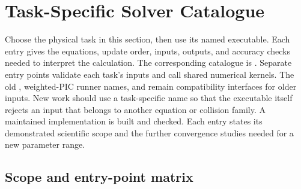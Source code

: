 \section{Task-Specific Solver Catalogue}
\label{sec:task-solver-catalogue}

Choose the physical task in this section, then use its named executable.
Each entry gives the equations, update order, inputs, outputs, and accuracy
checks needed to interpret the calculation. The corresponding catalogue is
. Separate entry points validate each task's
inputs and call shared numerical kernels.  The old
, weighted-PIC runner names, and
 remain compatibility interfaces for older
inputs.  New work should use a task-specific name so that the executable
itself rejects an input that belongs to another equation or collision family.
A maintained implementation is built and checked. Each entry states its
demonstrated scientific scope and the further convergence studies needed for
a new parameter range.

\subsection{Scope and entry-point matrix}

